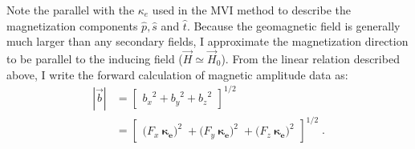 Note the parallel with the $\kappa_{e}$ used in the MVI method to describe the magnetization components $\hat p, \hat s$ and $ \hat t $.
Because the geomagnetic field is generally much larger than any secondary fields, I approximate the magnetization direction to be parallel to the inducing field ($\vec H \simeq \vec H_0$).
From the linear relation described above, I write the forward calculation of magnetic amplitude data as: 
\begin{equation}\label{MAI_Forward}
	\begin{split}
{|\vec b|} &= 
	\begin{bmatrix}
		{b_x}^2 + {b_y}^2 + {b_z}^2
	\end{bmatrix} ^{1/2} \\
	&= 
	\begin{bmatrix}
		({F_x} \: \boldsymbol{\kappa_e)}^2 \;+
	 ({F_y} \: \boldsymbol{\kappa_e)}^2 \;+
	({F_z} \: \boldsymbol{\kappa_e)}^2
	\end{bmatrix} ^{1/2} \;.
	\end{split}
\end{equation}
